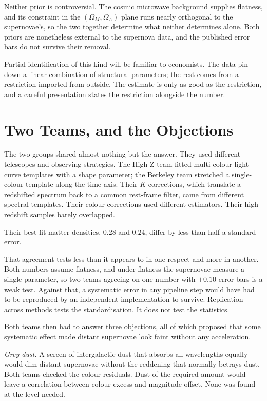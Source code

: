 \documentclass[11pt]{article}
\begin{document}
Neither prior is controversial.  The cosmic microwave background supplies
flatness, and its constraint in the $(\Omega_M, \Omega_\Lambda)$ plane runs
nearly orthogonal to the supernovae's, so the two together determine what
neither determines alone.  Both priors are nonetheless external to the
supernova data, and the published error bars do not survive their removal.

Partial identification of this kind will be familiar to economists.  The data
pin down a linear combination of structural parameters; the rest comes from a
restriction imported from outside.  The estimate is only as good as the
restriction, and a careful presentation states the restriction alongside the
number.

\section{Two Teams, and the Objections}

The two groups shared almost nothing but the answer.  They used different
telescopes and observing strategies.  The High-Z team fitted multi-colour
light-curve templates with a shape parameter; the Berkeley team stretched a
single-colour template along the time axis.  Their $K$-corrections, which
translate a redshifted spectrum back to a common rest-frame filter, came from
different spectral templates.  Their colour corrections used different
estimators.  Their high-redshift samples barely overlapped.

Their best-fit matter densities, $0.28$ and $0.24$, differ by less than half a
standard error.

That agreement tests less than it appears to in one respect and more in
another.  Both numbers assume flatness, and under flatness the supernovae
measure a single parameter, so two teams agreeing on one number with $\pm0.10$
error bars is a weak test.  Against that, a systematic error in any pipeline
step would have had to be reproduced by an independent implementation to
survive.  Replication across methods tests the standardisation.  It does not
test the statistics.

Both teams then had to answer three objections, all of which proposed that
some systematic effect made distant supernovae look faint without any
acceleration.

\emph{Grey dust.}  A screen of intergalactic dust that absorbs all
wavelengths equally would dim distant supernovae without the reddening that
normally betrays dust.  Both teams checked the colour residuals.  Dust of the
required amount would leave a correlation between colour excess and magnitude
offset.  None was found at the level needed.
\end{document}
